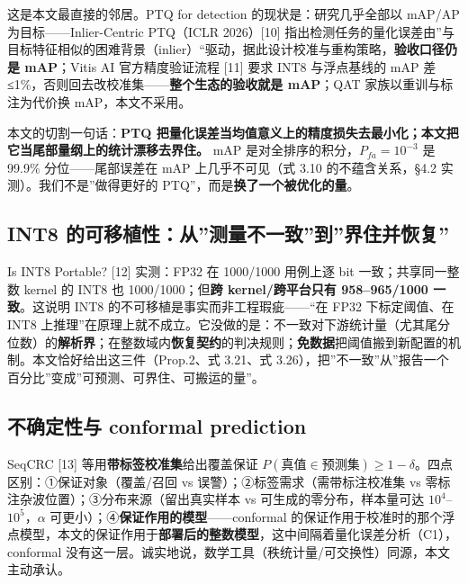 这是本文最直接的邻居。PTQ for detection 的现状是：研究几乎全部以 mAP/AP
为目标------Inlier-Centric PTQ（ICLR 2026）{[}10{]}
指出检测任务的量化误差由''与目标特征相似的困难背景（inlier）``驱动，据此设计校准与重构策略，\textbf{验收口径仍是
mAP}；Vitis AI 官方精度验证流程 {[}11{]} 要求 INT8 与浮点基线的 mAP 差
≤1\%，否则回去改校准集------\textbf{整个生态的验收就是 mAP}；QAT
家族以重训与标注为代价换 mAP，本文不采用。

本文的切割一句话：\textbf{PTQ
把量化误差当均值意义上的精度损失去最小化；本文把它当尾部量纲上的统计漂移去界住。}
mAP 是对全排序的积分，\(P_{fa}=10^{-3}\) 是 99.9\% 分位------尾部误差在
mAP 上几乎不可见（式 3.10 的不蕴含关系，§4.2
实测）。我们不是''做得更好的 PTQ''，而是\textbf{换了一个被优化的量}。

\subsection{INT8
的可移植性：从''测量不一致''到''界住并恢复''}\label{int8-ux7684ux53efux79fbux690dux6027ux4eceux6d4bux91cfux4e0dux4e00ux81f4ux5230ux754cux4f4fux5e76ux6062ux590d}

Is INT8 Portable? {[}12{]} 实测：FP32 在 1000/1000 用例上逐 bit
一致；共享同一整数 kernel 的 INT8 也 1000/1000；但\textbf{跨
kernel/跨平台只有 958--965/1000 一致}。这说明 INT8
的不可移植是事实而非工程瑕疵------``在 FP32 下标定阈值、在 INT8
上推理''在原理上就不成立。它没做的是：不一致对下游统计量（尤其尾分位数）的\textbf{解析界}；在整数域内\textbf{恢复契约}的判决规则；\textbf{免数据}把阈值搬到新配置的机制。本文恰好给出这三件（Prop.2、式
3.21、式
3.26），把''不一致''从''报告一个百分比''变成''可预测、可界住、可搬运的量''。

\subsection{不确定性与 conformal
prediction}\label{ux4e0dux786eux5b9aux6027ux4e0e-conformal-prediction}

SeqCRC {[}13{]} 等用\textbf{带标签校准集}给出覆盖保证
\(P(\text{真值}\in\text{预测集})\ge1-\delta\)。四点区别：①保证对象（覆盖/召回
vs 误警）；②标签需求（需带标注校准集 vs
零标注杂波位置）；③分布来源（留出真实样本 vs 可生成的零分布，样本量可达
\(10^4\)--\(10^5\)，\(\alpha\)
可更小）；④\textbf{保证作用的模型}------conformal
的保证作用于校准时的那个浮点模型，本文的保证作用于\textbf{部署后的整数模型}，这中间隔着量化误差分析（C1），conformal
没有这一层。诚实地说，数学工具（秩统计量/可交换性）同源，本文主动承认。

